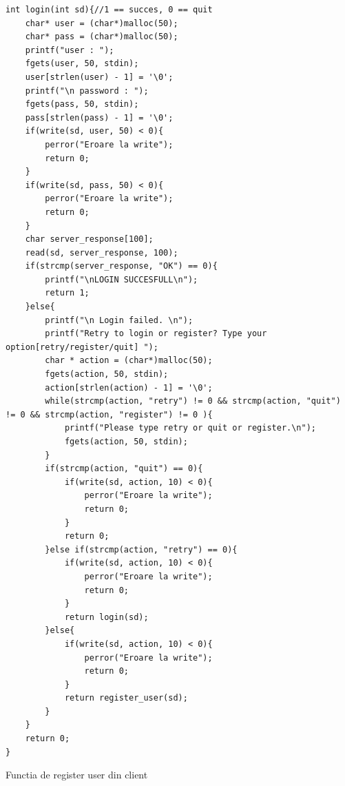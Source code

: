 \documentclass[runningheads]{llncs}
\begin{document}
\begin{lstlisting}
int login(int sd){//1 == succes, 0 == quit
    char* user = (char*)malloc(50);
    char* pass = (char*)malloc(50);
    printf("user : ");
    fgets(user, 50, stdin);
    user[strlen(user) - 1] = '\0';
    printf("\n password : ");
    fgets(pass, 50, stdin);
    pass[strlen(pass) - 1] = '\0';
    if(write(sd, user, 50) < 0){
        perror("Eroare la write");
        return 0;
    }
    if(write(sd, pass, 50) < 0){
        perror("Eroare la write");
        return 0;
    }
    char server_response[100];
    read(sd, server_response, 100);
    if(strcmp(server_response, "OK") == 0){
        printf("\nLOGIN SUCCESFULL\n");
        return 1;
    }else{
        printf("\n Login failed. \n");
        printf("Retry to login or register? Type your option[retry/register/quit] ");
        char * action = (char*)malloc(50);
        fgets(action, 50, stdin);
        action[strlen(action) - 1] = '\0';
        while(strcmp(action, "retry") != 0 && strcmp(action, "quit") != 0 && strcmp(action, "register") != 0 ){
            printf("Please type retry or quit or register.\n");
            fgets(action, 50, stdin);
        }
        if(strcmp(action, "quit") == 0){
            if(write(sd, action, 10) < 0){
                perror("Eroare la write");
                return 0;
            }
            return 0;
        }else if(strcmp(action, "retry") == 0){
            if(write(sd, action, 10) < 0){
                perror("Eroare la write");
                return 0;
            }
            return login(sd);
        }else{
            if(write(sd, action, 10) < 0){
                perror("Eroare la write");
                return 0;
            }
            return register_user(sd);
        }
    }
    return 0;
}
\end{lstlisting}
Functia de register user din client
\end{document}
